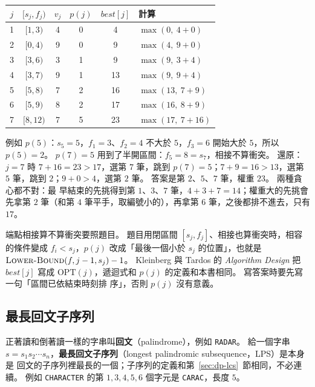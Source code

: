 \begin{center}
\small
\begin{tabular}{cccccl}
\toprule
$j$ & $[s_j, f_j)$ & $v_j$ & $p(j)$ & $\mathit{best}[j]$ & 計算 \\
\midrule
1 & $[1, 3)$ & 4 & 0 & 4 & $\max(0,\ 4 + 0)$ \\
2 & $[0, 4)$ & 9 & 0 & 9 & $\max(4,\ 9 + 0)$ \\
3 & $[3, 6)$ & 3 & 1 & 9 & $\max(9,\ 3 + 4)$ \\
4 & $[3, 7)$ & 9 & 1 & 13 & $\max(9,\ 9 + 4)$ \\
5 & $[5, 8)$ & 7 & 2 & 16 & $\max(13,\ 7 + 9)$ \\
6 & $[5, 9)$ & 8 & 2 & 17 & $\max(16,\ 8 + 9)$ \\
7 & $[8, 12)$ & 7 & 5 & 23 & $\max(17,\ 7 + 16)$ \\
\bottomrule
\end{tabular}
\end{center}

例如 $p(5)$：$s_5 = 5$，$f_1 = 3$、$f_2 = 4$ 不大於 $5$，$f_3 = 6$ 開始大於 $5$，所以
$p(5) = 2$。 $p(7) = 5$ 用到了半開區間：$f_5 = 8 = s_7$，相接不算衝突。 還原：$j = 7$ 時
$7 + 16 = 23 > 17$，選第 $7$ 筆，跳到 $p(7) = 5$；$7 + 9 = 16 > 13$，選第 $5$ 筆，跳到
$2$；$9 + 0 > 4$，選第 $2$ 筆。 答案是第 $2$、$5$、$7$ 筆，權重 $23$。 兩種貪心都不對：最
早結束的先挑得到第 $1$、$3$、$7$ 筆，$4 + 3 + 7 = 14$；權重大的先挑會先拿第 $2$ 筆（和第
$4$ 筆平手，取編號小的），再拿第 $6$ 筆，之後都排不進去，只有 $17$。

\begin{examnote}
端點相接算不算衝突要照題目。 題目用閉區間 $[s_j, f_j]$、相接也算衝突時，相容的條件變成
$f_i < s_j$，$p(j)$ 改成「最後一個小於 $s_j$ 的位置」，也就是 $\proc{Lower-Bound}(f, j - 1,
s_j) - 1$。 Kleinberg 與 Tardos 的 \textit{Algorithm Design} 把 $\mathit{best}[j]$ 寫成
$\mathrm{OPT}(j)$，遞迴式和 $p(j)$ 的定義和本書相同。 寫答案時要先寫一句「區間已依結束時刻排
序」，否則 $p(j)$ 沒有意義。
\end{examnote}

\subsection{最長回文子序列}
\label{sec:dp-lps}

正著讀和倒著讀一樣的字串叫\textbf{回文}（palindrome），例如 \texttt{RADAR}。 給一個字串
$s = s_1 s_2 \cdots s_n$，\textbf{最長回文子序列}（longest palindromic subsequence，LPS）是本身是
回文的子序列裡最長的一個；子序列的定義和第~\ref{sec:dp-lcs}~節相同，不必連續。 例如
\texttt{CHARACTER} 的第 $1, 3, 4, 5, 6$ 個字元是 \texttt{CARAC}，長度 $5$。

